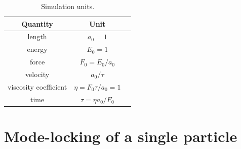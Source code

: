 \documentclass[twocolumn,preprintnumbers,amsmath,amssymb,aps,prx]{revtex4}
\begin{document}
\begin{table}[h!]
\centering
\caption{Simulation units.}
\begin{ruledtabular}
\begin{tabular}{c c p{5cm}}
Quantity & Unit \\
\hline
length &  $a_0 = 1$ \\
energy & $E_0 = 1$ \\
force & $F_0 = E_0 / a_0$\\
velocity &  $ a_0 / \tau $ \\
viscosity coefficient & $\eta = F_0 \tau / a_0 = 1 $\\
time &  $ \tau = \eta a_0 / F_0 $ \\

\end{tabular}
\end{ruledtabular}
\label{tab:1}
\end{table}

%
\section{Mode-locking of a single particle}
\label{sec:one}
\end{document}

